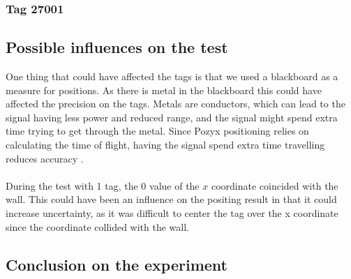 \subsubsection{Tag 27001}

\subsection{Possible influences on the test}
One thing that could have affected the tags is that we used a blackboard as a measure for positions. 
As there is metal in the blackboard this could have affected the precision on the tags.
Metals are conductors, which can lead to the signal having less power and reduced range, and the signal might spend extra time trying to get through the metal.
Since Pozyx positioning relies on calculating the time of flight, having the signal spend extra time travelling reduces accuracy \cite{pozyx-UWBObstacles}. 
\\\\
During the test with 1 tag, the 0 value of the $x$ coordinate coincided with the wall. 
This could have been an influence on the positing result in that it could increase uncertainty, as it was difficult to center the tag over the x coordinate since the coordinate collided with the wall.

\subsection{Conclusion on the experiment}
